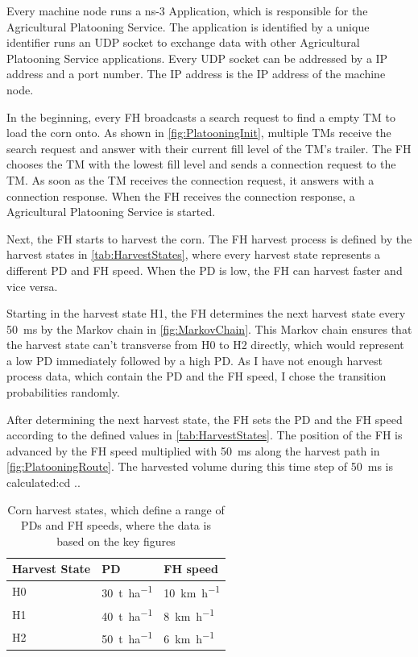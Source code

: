 Every machine node runs a ns-3 Application, which is responsible for the Agricultural Platooning Service. The application
is identified by a unique identifier runs an UDP socket to exchange data with other Agricultural Platooning Service applications.
Every UDP socket can be addressed by a IP address and a port number. The IP address is the IP address of the machine node.

In the beginning, every \ac{FH} broadcasts a search request to find a empty \ac{TM} to load the corn onto.
As shown in \autoref{fig:PlatooningInit}, multiple \ac{TM}s receive the search request and answer with their current fill level of the \ac{TM}'s
trailer. The \ac{FH} chooses the \ac{TM} with the lowest fill level and sends a connection request to the \ac{TM}. As soon as the 
\ac{TM} receives the connection request, it answers with a connection response. When the \ac{FH} receives the connection response, a
Agricultural Platooning Service is started.

Next, the \ac{FH} starts to harvest the corn. The FH harvest process is defined by the harvest states in \autoref{tab:HarvestStates},
where every harvest state represents a different \ac{PD} and \ac{FH} speed. When the \ac{PD} is low, the \ac{FH} can harvest faster
and vice versa.

Starting in the harvest state H1, the \ac{FH} determines the next harvest state every \SI{50}{\milli\second} by the Markov chain in
\autoref{fig:MarkovChain}. This Markov chain ensures that the harvest state can't transverse from H0 to H2 directly, which would represent
a low \ac{PD} immediately followed by a high \ac{PD}. As I have not enough harvest process data, which contain the \ac{PD} and the \ac{FH} speed,
I chose the transition probabilities randomly.

After determining the next harvest state, the \ac{FH} sets the \ac{PD} and the \ac{FH} speed according to the defined values in
\autoref{tab:HarvestStates}. The position of the \ac{FH} is advanced by the \ac{FH} speed multiplied with \SI{50}{\milli\second} along the
harvest path in \autoref{fig:PlatooningRoute}. The harvested volume during this time step of \SI{50}{\milli\second} is calculated:cd ..


\begin{table}[H]
	\centering
	\begin{tabular}{>{\centering}p{2cm}p{4cm}p{4cm}}
		\toprule
		Harvest State & \ac{PD} & \ac{FH} speed\\
		\midrule
		H0 & \SI{30}{\tonne\per\hectare}
        & \SI{10}{\kilo\metre\per\hour} \\
		H1 & \SI{40}{\tonne\per\hectare}
        & \SI{8}{\kilo\metre\per\hour} \\
		H2 & \SI{50}{\tonne\per\hectare}
        & \SI{6}{\kilo\metre\per\hour} \\
		\bottomrule
	\end{tabular}
	\caption{Corn harvest states, which define a range of \acf{PD}s and \ac{FH} speeds, where the data is based on the
	key figures \cite{faustzahlen2018}}
	\label{tab:markov_chain}
\end{table}

